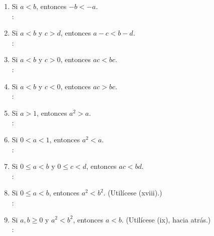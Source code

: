 \begin{enumerate}
\begin{enumerate}[label=\roman*]
        \item Si $ a < b $, entonces $ -b < -a $.  \\
        \solucion: \\
        
        \item Si $ a < b $ y $ c > d $, entonces $ a - c < b - d $. \\
        \solucion: \\
        
        \item Si $ a < b $ y $ c > 0 $, entonces $ ac < bc $. \\
        \solucion: \\
        
        \item Si $ a < b $ y $ c < 0  $, entonces $ ac > bc $. \\
        \solucion: \\
        
        \item Si $ a > 1 $, entonces $a^2 > a $. \\
        \solucion: \\
        
        \item Si $ 0 < a < 1 $, entonces $ a^2 < a $. \\
        \solucion: \\
        
        \item Si $ 0 \leq a < b $ y $ 0 \leq c < d $, entonces $ ac < bd $. \\
        \solucion: \\
        
        \item Si $ 0 \leq a < b $, entonces $ a^2 < b^2 $. (Utilícese (xviii).)  \\
        \solucion: \\
        
        \item Si $ a, b \geq 0 $ y $ a^2 < b^2 $, entonces $ a < b $. (Utilícese (ix), hacia atrás.) \\
        \solucion: \\
        

\end{enumerate}
\end{enumerate}

